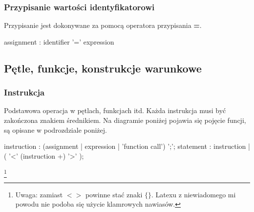 \documentclass[12pt,a4paper]{article}
\begin{document}
\subsubsection{Przypisanie wartości identyfikatorowi}

Przypisanie jest dokonywane za pomocą operatora przypisania \textbf{=}. 

\begin{rail}

assignment : identifier '=' expression

\end{rail}

\subsection{Pętle, funkcje, konstrukcje warunkowe}

\subsubsection{Instrukcja}

Podstawowa operacja w pętlach, funkcjach itd.
Każda instrukcja musi być zakończona znakiem średnikiem. Na diagramie poniżej pojawia się pojęcie funcji, są opisane w podrozdziale poniżej.

\begin{rail}
      instruction : (assignment | expression | 'function call') ';';
      statement : instruction | ( '<' (instruction +)  '>' );

\end{rail}

\footnote{Uwaga: zamiast \textbf{$< >$} powinne stać znaki \textbf{$\{ \}$}. Latexu z niewiadomego mi powodu nie podoba się użycie klamrowych nawiasów.}
\end{document}
